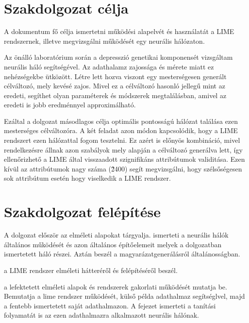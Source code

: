 \section{Szakdolgozat célja}

A dokumentum fő célja ismertetni működési alapelvét és használatát a LIME rendszernek, illetve megvizsgálni működését egy neurális hálózaton.

Az önálló laboratórium során a depresszió genetikai komponensét vizsgáltam neurális háló segítségével. Az adathalamz zajossága és mérete miatt ez nehézségekbe ütközött. Létre lett hozva viszont egy mesterségesen generált célváltozó, mely kevésé zajos. Mivel ez a célváltozó hasonló jellegű mint az eredeti, segíthet olyan paraméterek és módszerek megtalálásban, amivel az eredeti is jobb eredménnyel approximálható.

Ezáltal a dolgozat másodlagos célja optimális pontosságú hálózat találása ezen mesterséges célváltozóra. A két feladat azon módon kapcsolódik, hogy a LIME rendszert ezen hálózattal fogom tesztelni. Ez azért is előnyös kombináció, mivel rendelkezésre állnak azon szabályok mely alapján a célváltozó generálva lett, így ellenőrizhető a LIME által visszaadott szignifikáns attribútumok validitása. Ezen kívül az attribútumok nagy száma (\~2400) segít megvizsgálni, hogy szélsőségesen sok attribútum esetén hogy viselkedik a LIME rendszer.

\section{Szakdolgozat felépítése}

A dolgozat először az elméleti alapokat tárgyalja.  ismerteti a neurális hálók általános működését és azon általános építőelemeit melyek a dolgozatban ismertetett háló részei. Aztán  beszél a magyarázatgenerálásról általánosságban. 

 a LIME rendszer elméleti hátteréről és felépítéséről beszél.

 a lefektetett elméleti alapok és rendszerek gakorlati működését mutatja be. Bemutatja a lime rendszer működését, külső példa adathalmaz segítséglvel, majd a fentebb ismertetett saját adathalmazon. A fejezet ismerteti a tanítási folyamatát is az ezen adathalmazra alkalmazott neurális hálónak.




